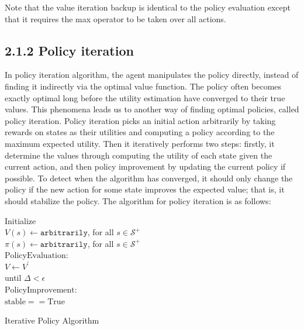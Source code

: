 \documentclass[a4paper, 12pt]{report}
\begin{document}
Note that the value iteration backup is identical to the policy evaluation except that it requires the max operator to be taken over all actions.

\subsection*{2.1.2 Policy iteration}

In policy iteration algorithm, the agent manipulates the policy directly, instead of finding it indirectly via the optimal value function. 
The policy often becomes exactly optimal long before the utility estimation have converged to their true values. This phenomena leads us to another way of finding optimal policies, called policy iteration. Policy iteration picks an initial action arbitrarily by taking rewards on states as
their utilities and computing a policy according to the maximum expected
utility. Then it iteratively performs two steps: firstly, it determine the values through
computing the utility of each state given the current action, and then policy improvement by updating the current policy if possible. 
To detect when the algorithm has converged, it should only change the policy if the new action for some state improves the expected value; that is, it should stabilize the policy.
The algorithm for policy iteration is as follows:

\begin{algorithm}[H]
Initialize \\
$V(s) \gets \texttt{arbitrarily}$, for all $s \in \mathcal S^+$\\
$\pi(s) \gets \texttt{arbitrarily}$, for all $s \in \mathcal S^+$\\
$\mathrm{Policy Evaluation:}$\\
$V \gets V^{'}$\\
until {$\Delta < \epsilon$}\\
$\mathrm{Policy Improvement:}$\\
$\mathrm{stable == True}$\\
\caption{Iterative Policy Algorithm}
\end{algorithm}
\end{document}
